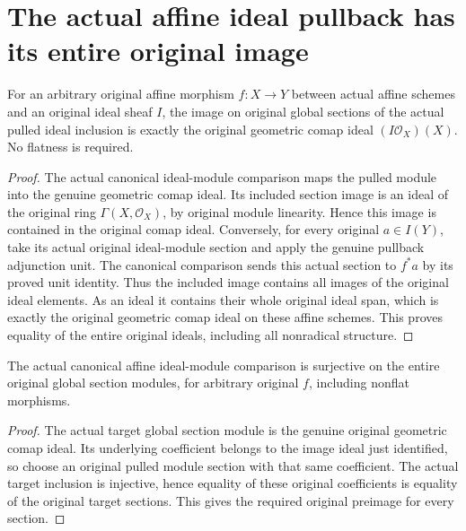 \section{The actual affine ideal pullback has its entire original image}

\begin{lemma}
\label{lem:actual-affine-ideal-pullback-image}
\leanok
For an arbitrary original affine morphism $f:X\to Y$ between actual
affine schemes and an original ideal sheaf $I$, the image on original
global sections of the actual pulled ideal inclusion is exactly the
original geometric comap ideal $(I\mathcal O_X)(X)$. No flatness is
required.
\end{lemma}
\begin{proof}
The actual canonical ideal-module comparison maps the pulled module
into the genuine geometric comap ideal. Its included section image
is an ideal of the original ring $\Gamma(X,\mathcal O_X)$, by
original module linearity. Hence this image is contained in the
original comap ideal. Conversely, for every original
$a\in I(Y)$, take its actual original ideal-module section and apply
the genuine pullback adjunction unit. The canonical comparison sends
this actual section to $f^*a$ by its proved unit identity. Thus the
included image contains all images of the original ideal elements.
As an ideal it contains their whole original ideal span, which is
exactly the original geometric comap ideal on these affine schemes.
This proves equality of the entire original ideals, including all
nonradical structure.
\end{proof}

\begin{corollary}
\label{cor:actual-affine-ideal-pullback-comparison-surjective}
\leanok
{}
The actual canonical affine ideal-module comparison is surjective on
the entire original global section modules, for arbitrary original
$f$, including nonflat morphisms.
\end{corollary}
\begin{proof}
The actual target global section module is the genuine original
geometric comap ideal. Its underlying coefficient belongs to the
image ideal just identified, so choose an original pulled module
section with that same coefficient. The actual target inclusion is
injective, hence equality of these original coefficients is equality
of the original target sections. This gives the required original
preimage for every section.
\end{proof}
